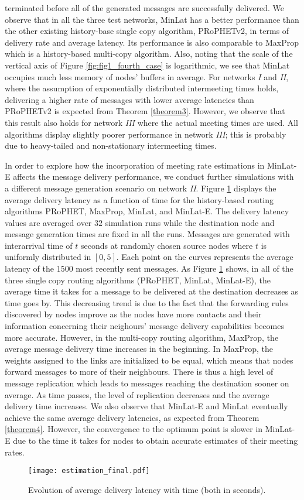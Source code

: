\documentclass[journal,onecolumn,11pt]{IEEEtran}
\theoremstyle{plain}
\theoremstyle{definition}
\begin{document}
terminated before all of the generated messages are successfully
delivered. We observe that in all the three test networks, MinLat has
a better performance than the other existing history-base single copy
algorithm, PRoPHETv2, in terms of delivery rate and average
latency. Its performance is also comparable to MaxProp which is a
history-based multi-copy algorithm. Also, noting that the scale of the
vertical axis of Figure \ref{fig:fig1_fourth_case} is logarithmic, we
see that MinLat occupies much less memory of nodes' buffers in
average. For networks {\em I} and {\em II}, where the assumption of
exponentially distributed intermeeting times holds, delivering a
higher rate of messages with lower average latencies than PRoPHETv2 is
expected from Theorem \ref{theorem3}. However, we observe that this
result also holds for network {\em III} where the actual meeting times
are used. All algorithms display slightly poorer performance in
network {\em III}; this is probably due to heavy-tailed and
non-stationary intermeeting times.

In order to explore how the incorporation of meeting rate estimations
in MinLat-E affects the message delivery performance, we conduct
further simulations with a different message generation scenario on
network {\em II}. Figure \ref{fig:fig2} displays the average delivery
latency as a function of time for the history-based routing algorithms
PRoPHET, MaxProp, MinLat, and MinLat-E. The delivery latency values are
averaged over $32$ simulation runs while the destination node and
message generation times are fixed in all the runs. Messages are
generated with interarrival time of $t$ seconds at randomly chosen
source nodes where $t$ is uniformly distributed in $[0,5]$. Each point
on the curves represents the average latency of the $1500$ most
recently sent messages. As Figure \ref{fig:fig2} shows, in all of the
three single copy routing algorithms (PRoPHET, MinLat, MinLat-E), the
average time it takes for a message to be delivered at the destination
decreases as time goes by. This decreasing trend is due to the fact
that the forwarding rules discovered by nodes improve as the
nodes have more contacts and their information concerning their neighours'
message delivery capabilities becomes more accurate. However, in the
multi-copy routing algorithm, MaxProp, the average message delivery
time increases in the beginning. In MaxProp, the weights assigned to the
links are initialized to be equal, which means that nodes forward
messages to more of their neighbours. There is thus a high level of
message replication which leads to messages reaching the destination
sooner on average. As time passes, the level of replication decreases and the
average delivery time increases. We also observe that MinLat-E and MinLat
eventually achieve the same average delivery latencies, as expected from Theorem
\ref{theorem4}. However, the convergence to the optimum point is
slower in MinLat-E due to the time it takes for nodes to obtain
accurate estimates of their meeting rates.
\begin{figure}[!hbt]
\centering
\texttt{[image: estimation\_final.pdf]}
\caption{Evolution of average delivery latency with time (both in seconds).}
\label{fig:fig2}
\end{figure}
\end{document}
